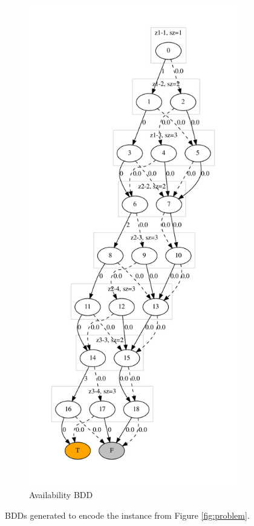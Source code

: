 \documentclass[11pt]{article}
\begin{document}
\begin{figure}[t!]
\begin{subfigure}[t]{0.45\textwidth}
  \end{subfigure}%
  \hfill
  \begin{subfigure}[t]{0.45\textwidth}
    \includegraphics[height=\textheight]{./availability.dot.pdf}
    \caption{Availability BDD}\label{fig:avail}
  \end{subfigure}
  \caption{BDDs generated to encode the instance from Figure \ref{fig:problem}.}
\end{figure}
\end{document}
